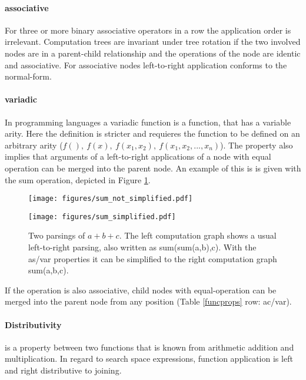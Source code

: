 \documentclass[english]{article}
\begin{document}
\paragraph{associative} For three or more binary associative operators in a row the application order is irrelevant. Computation trees are invariant under tree rotation if the two involved nodes are in a parent-child relationship and the operations of the node are identic and associative. For associative nodes left-to-right application conforms to the normal-form.

\paragraph{variadic}
In programming languages a variadic function is a function, that has a variable arity. Here the definition is stricter and requieres the function to be defined on an arbitrary arity ($f(),\ f(x),\ f(x_1,x_2),\ f(x_1,x_2,...,x_n)$).  The property also implies that arguments of a left-to-right applications of a node with equal operation can be merged into the parent node. An example of this is is given with the sum operation, depicted in Figure \ref{as/var transform}.

\begin{figure}

\begin{minipage}[b]{0.35\textwidth}
\caption{Two parsings of $a+b+c$. The left computation graph shows a usual left-to-right parsing, also written as sum(sum(a,b),c). With the as/var properties it can be simplified to the right computation graph sum(a,b,c).}
\label{as/var transform}
\end{minipage}%
\hfill%
\begin{minipage}[b]{0.3\textwidth}
\centering
\texttt{[image: figures/sum\_not\_simplified.pdf]}

\end{minipage}%
\hfill%
\begin{minipage}[b]{0.3\textwidth}
\centering
\texttt{[image: figures/sum\_simplified.pdf]}
\end{minipage}%
\end{figure}

If the operation is also associative, child nodes with equal-operation can be merged into the parent node from any position (Table \ref{funcprops} row: ac/var).

\paragraph{Distributivity} is a property between two functions that is known from arithmetic addition and multiplication. In regard to search space expressions, function application is left and right distributive to joining.
\end{document}
